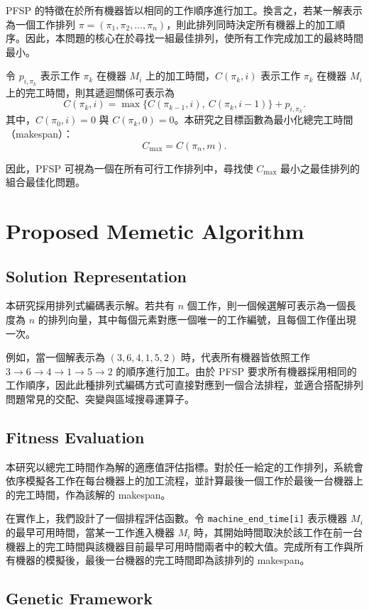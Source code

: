 \documentclass[conference]{IEEEtran}
\begin{document}
PFSP 的特徵在於所有機器皆以相同的工作順序進行加工。換言之，若某一解表示為一個工作排列 \(\pi = (\pi_1, \pi_2, \dots, \pi_n)\)，則此排列同時決定所有機器上的加工順序。因此，本問題的核心在於尋找一組最佳排列，使所有工作完成加工的最終時間最小。

令 \(p_{i,\pi_k}\) 表示工作 \(\pi_k\) 在機器 \(M_i\) 上的加工時間，\(C(\pi_k, i)\) 表示工作 \(\pi_k\) 在機器 \(M_i\) 上的完工時間，則其遞迴關係可表示為
\[C(\pi_k, i) = \max \{ C(\pi_{k-1}, i),\ C(\pi_k, i-1) \} + p_{i,\pi_k}.\]
其中，\(C(\pi_0, i) = 0\) 與 \(C(\pi_k, 0) = 0\)。本研究之目標函數為最小化總完工時間（makespan）：
\[C_{\max} = C(\pi_n, m).\]

因此，PFSP 可視為一個在所有可行工作排列中，尋找使 \(C_{\max}\) 最小之最佳排列的組合最佳化問題。

\section{Proposed Memetic Algorithm}
\subsection{Solution Representation}
本研究採用排列式編碼表示解。若共有 \(n\) 個工作，則一個候選解可表示為一個長度為 \(n\) 的排列向量，其中每個元素對應一個唯一的工作編號，且每個工作僅出現一次。

例如，當一個解表示為 \((3,6,4,1,5,2)\) 時，代表所有機器皆依照工作 \(3 \rightarrow 6 \rightarrow 4 \rightarrow 1 \rightarrow 5 \rightarrow 2\) 的順序進行加工。由於 PFSP 要求所有機器採用相同的工作順序，因此此種排列式編碼方式可直接對應到一個合法排程，並適合搭配排列問題常見的交配、突變與區域搜尋運算子。
\subsection{Fitness Evaluation}
本研究以總完工時間作為解的適應值評估指標。對於任一給定的工作排列，系統會依序模擬各工作在每台機器上的加工流程，並計算最後一個工作於最後一台機器上的完工時間，作為該解的 makespan。

在實作上，我們設計了一個排程評估函數。令 \texttt{machine\_end\_time[i]} 表示機器 \(M_i\) 的最早可用時間，當某一工作進入機器 \(M_i\) 時，其開始時間取決於該工作在前一台機器上的完工時間與該機器目前最早可用時間兩者中的較大值。完成所有工作與所有機器的模擬後，最後一台機器的完工時間即為該排列的 makespan。
\subsection{Genetic Framework}
\end{document}
